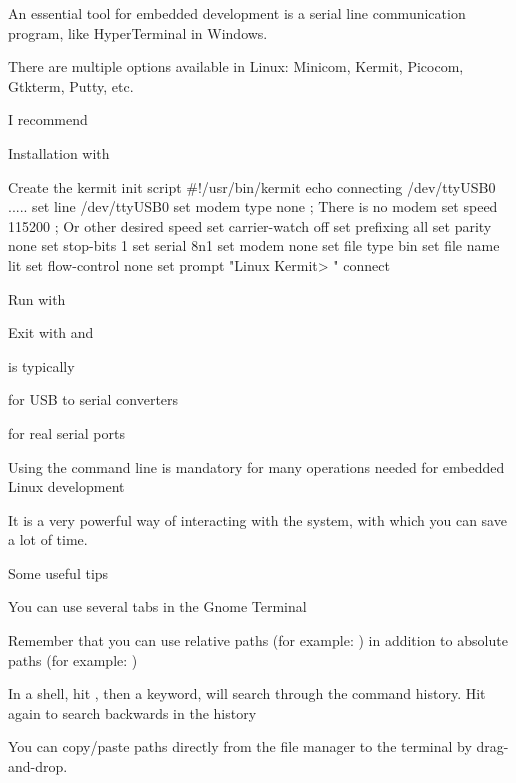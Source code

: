   \startitemize
  \item An essential tool for embedded development is a serial line
    communication program, like HyperTerminal in Windows.
  \item There are multiple options available in Linux: Minicom,
    Kermit, Picocom, Gtkterm, Putty, etc.
  \item I recommend 
    \startitemize
    \item Installation with 
    \item Create the kermit init script 
\starttyping
#!/usr/bin/kermit
echo connecting /dev/ttyUSB0 .....
set line /dev/ttyUSB0
set modem type none   ; There is no modem
set speed 115200       ; Or other desired speed
set carrier-watch off
set prefixing all
set parity none
set stop-bits 1
set serial 8n1
set modem none
set file type bin
set file name lit
set flow-control none
set prompt "Linux Kermit> "
connect
\stoptyping
    \item Run with 
    \item Exit with  and 
    \stopitemize
  \item {} is typically
    \startitemize
    \item {} for USB to serial converters
    \item {} for real serial ports
    \stopitemize
  \stopitemize

  \startitemize
  \item Using the command line is mandatory for many operations needed
    for embedded Linux development
  \item It is a very powerful way of interacting with the system, with
    which you can save a lot of time.
  \item Some useful tips
    \startitemize
    \item You can use several tabs in the Gnome Terminal
    \item Remember that you can use relative paths (for example:
      ) in addition to absolute paths (for example:
      )
    \item In a shell, hit \type{[Control] [r]}, then a keyword, will
      search through the command history. Hit \type{[Control] [r]}
      again to search backwards in the history
    \item You can copy/paste paths directly from the file manager to
      the terminal by drag-and-drop.
    \stopitemize
  \stopitemize


